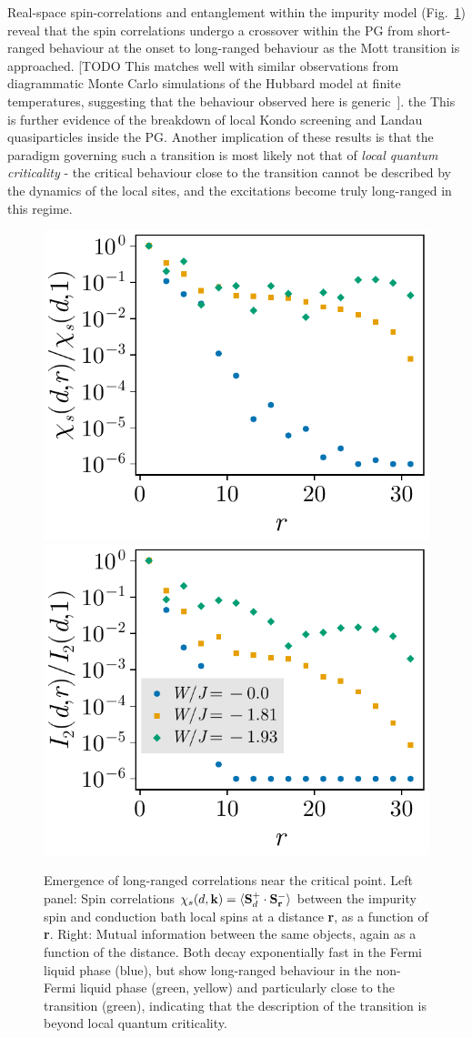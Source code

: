 \documentclass[%
 reprint,
superscriptaddress,
groupedaddress,
 amsmath,amssymb,
 aps,
prl
]{revtex4-2}
\begin{document}
Real-space spin-correlations and entanglement within the impurity model (Fig.~\ref{realSpaceCorrelations}) reveal that the spin correlations undergo a crossover within the PG from short-ranged behaviour at the onset to long-ranged behaviour as the Mott transition is approached. [TODO This matches well with similar observations from diagrammatic Monte Carlo simulations of the Hubbard model at finite temperatures, suggesting that the behaviour observed here is generic~\cite{SimkovicFerrero2024}]. the This is further evidence of the breakdown of local Kondo screening and Landau quasiparticles inside the PG. Another implication of these results is that the paradigm governing such a transition is most likely not that of {\it local quantum criticality} - the critical behaviour close to the transition cannot be described by the dynamics of the local sites, and the excitations become truly long-ranged in this regime.

\begin{figure}
    \centering
    \includegraphics[width=0.49\linewidth]{SF-di_69-2000.pdf}
    \includegraphics[width=0.49\linewidth]{I2-di_69-2000.pdf}
    \caption{Emergence of long-ranged correlations near the critical point. Left panel: Spin correlations $\chi_s(d,{\bf k}) = \braket{{\bf S}_d^+\cdot{\bf S}_{\bf r}^-}$ between the impurity spin and conduction bath local spins at a distance {\bf r}, as a function of {\bf r}. Right: Mutual information between the same objects, again as a function of the distance. Both decay exponentially fast in the Fermi liquid phase (blue), but show long-ranged behaviour in the non-Fermi liquid phase (green, yellow) and particularly close to the transition (green), indicating that the description of the transition is beyond local quantum criticality.}
    \label{realSpaceCorrelations}
\end{figure}
\end{document}
